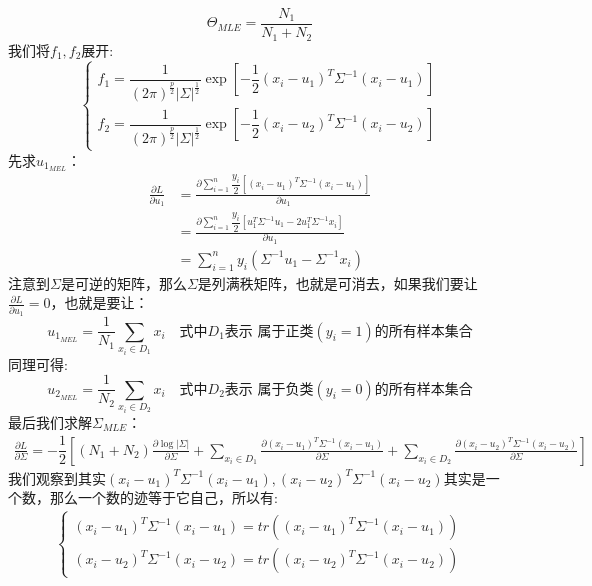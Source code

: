 \documentclass[withoutpreface,bwprint]{cumcmthesis} %
\begin{document}
	\begin{equation}
		\Theta_{MLE}=\dfrac{N_1}{N_1+N_2}
	\end{equation}
	我们将$f_1,f_2$展开:
	\begin{equation}
		\begin{cases}
			f_1=\dfrac{1}{ \left(2\pi \right)^{ \frac{p}{2} } |\Sigma|^{\frac{1}{2}} } \exp \left[ -\dfrac{1}{2} \left(x_i-u_1 \right)^T\Sigma^{-1}  \left(x_i-u_1 \right) \right]  
			\\
			f_2=\dfrac{1}{ \left(2\pi \right)^{ \frac{p}{2} } |\Sigma|^{\frac{1}{2}} } \exp \left[ -\dfrac{1}{2} \left(x_i-u_2 \right)^T\Sigma^{-1}  \left(x_i-u_2 \right) \right] 
		\end{cases}
	\end{equation}
	先求$u_{1_{MEL}}$：
	\begin{align*}
		\frac{\partial L}{\partial u_1}&=\frac{\partial \sum_{i=1}^{n}  \dfrac{y_i}{2} \left[ (x_i-u_1)^T \Sigma^{-1} (x_i-u_1) \right]}{\partial u_1}\\
		&=\frac{\partial \sum_{i=1}^{n}  \dfrac{y_i}{2} \left[ u_1^T\Sigma^{-1}u_1-2u_1^T\Sigma^{-1}x_i \right]}{\partial u_1}\\
		&=\sum_{i=1}^{n} y_i \left( \Sigma^{-1}u_1 -\Sigma^{-1}x_i\right)
	\end{align*}
	注意到$\Sigma$是可逆的矩阵，那么$\Sigma$是列满秩矩阵，也就是可消去，如果我们要让$\frac{\partial L}{\partial u_1}=0$，也就是要让：
	\begin{equation}
		u_{1_{MEL}}=\dfrac{1}{N_1}\sum_{x_i \in D_1} x_i \quad \textbf{式中$D_1$表示 属于正类$(y_i=1)$的所有样本集合}
	\end{equation}
	同理可得:
	\begin{equation}
		u_{2_{MEL}}=\dfrac{1}{N_2}\sum_{x_i \in D_2} x_i \quad \textbf{式中$D_2$表示 属于负类$(y_i=0)$的所有样本集合}
	\end{equation}
	最后我们求解$\Sigma_{MLE}$：
	\begin{align*}
		\frac{\partial L}{\partial \Sigma}=-\dfrac{1}{2} \left[ (N_1+N_2)\frac{\partial \log |\Sigma|}{\partial \Sigma} +\sum_{x_i \in D_1}
		\frac{\partial (x_i-u_1)^T\Sigma^{-1}(x_i-u_1)}{\partial \Sigma}+\sum_{x_i \in D_2}
		\frac{\partial (x_i-u_2)^T\Sigma^{-1}(x_i-u_2)}{\partial \Sigma}
		\right]
	\end{align*}
	我们观察到其实$(x_i-u_1)^T\Sigma^{-1}(x_i-u_1),(x_i-u_2)^T\Sigma^{-1}(x_i-u_2)$其实是一个数，那么一个数的迹等于它自己，所以有:
	\begin{align}
		\begin{cases}
			(x_i-u_1)^T\Sigma^{-1}(x_i-u_1) =tr((x_i-u_1)^T\Sigma^{-1}(x_i-u_1)) 
			\\
			(x_i-u_2)^T\Sigma^{-1}(x_i-u_2) =tr((x_i-u_2)^T\Sigma^{-1}(x_i-u_2))
		\end{cases}
	\end{align}
\end{document}
